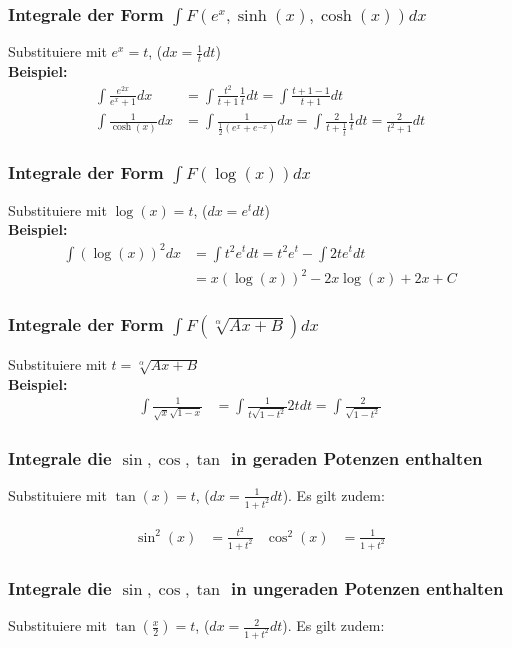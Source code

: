 \documentclass[25pt]{sciposter}
\begin{document}
\begin{multicols}{3}
\subsubsection*{Integrale der Form $\int F(e^x, \sinh(x), \cosh(x)) dx$}
Substituiere mit $e^x = t$, ($dx = \frac{1}{t} dt$)\\
\textbf{Beispiel:}
\begin{align*}
	\int \frac{e^{2x}}{e^x + 1} dx &= \int \frac{t^2}{t + 1 } \frac{1}{t} dt = \int\frac{t +1 - 1}{t+1} dt\\
	\int \frac{1}{\cosh(x)} dx &= \int \frac{1}{\frac{1}{2} (e^x + e^{-x})} dx = \int \frac{2}{t + \frac{1}{t}} \frac{1}{t} dt = \frac{2}{t^2 + 1} dt
\end{align*}

\subsubsection*{Integrale der Form $\int F(\log(x)) dx$}
Substituiere mit $\log(x) = t$, ($dx = e^t dt$)\\
\textbf{Beispiel:}
\begin{align*}
	\int (\log(x))^2 dx &= \int t^2 e^t dt = t^2 e^t - \int 2t e^t dt  \\
	&= x(\log(x))^2 -2x\log(x) + 2x + C
\end{align*}

\subsubsection*{Integrale der Form $\int F(\sqrt[\alpha]{Ax + B}) dx$}
Substituiere mit $t = \sqrt[\alpha]{Ax + B}$\\
\textbf{Beispiel:}
\begin{align*}
	\int \frac{1}{\sqrt{x} \sqrt{1-x}} &= \int \frac{1}{t \sqrt{1-t^2}} 2t dt = \int \frac{2}{\sqrt{1-t^2}}
\end{align*}

\subsubsection*{Integrale die $\sin, \cos, \tan$ in geraden Potenzen enthalten}
Substituiere mit $\tan(x) = t$, ($dx = \frac{1}{1+t^2} dt$). Es gilt zudem:

\begin{align*}
\sin^2(x) &= \frac{t^2}{1+t^2} & \cos^2(x) &= \frac{1}{1+t^2}
\end{align*}

\subsubsection*{Integrale die $\sin, \cos, \tan$ in ungeraden Potenzen enthalten}
Substituiere mit $\tan(\frac{x}{2}) = t$, ($dx = \frac{2}{1+t^2} dt$). Es gilt zudem:


\end{multicols}
\end{document}
